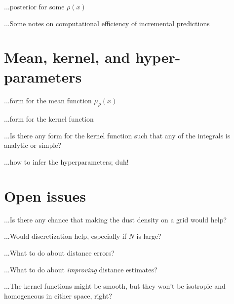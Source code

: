 \documentclass[12pt, letterpaper]{article}
\begin{document}
...posterior for some $\rho(x)$

...Some notes on computational efficiency of incremental predictions

\section{Mean, kernel, and hyper-parameters}

...form for the mean function $\mu_\rho(x)$

...form for the kernel function

...Is there any form for the kernel function such that any of the integrals is analytic or simple?

...how to infer the hyperparameters; duh!

\section{Open issues}

...Is there any chance that making the dust density on a grid would help?

...Would discretization help, especially if $N$ is large?

...What to do about distance errors?

...What to do about \emph{improving} distance estimates?

...The kernel functions might be smooth, but they won't be isotropic and homogeneous in either space, right?
\end{document}
